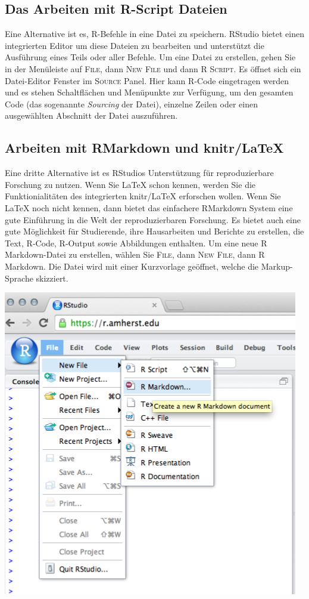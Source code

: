 \documentclass[
  ngerman,
]{scrbook}
\begin{document}
\hypertarget{das-arbeiten-mit-r-script-dateien}{%
\subsection{Das Arbeiten mit R-Script Dateien}\label{das-arbeiten-mit-r-script-dateien}}

Eine Alternative ist es, \textsf{R}-Befehle in eine Datei zu speichern. \textsf{RStudio} bietet einen integrierten Editor um diese Dateien zu bearbeiten und unterstützt die Ausführung eines Teils oder aller Befehle.
Um eine Datei zu erstellen, gehen Sie in der Menüleiste auf \textsc{File}, dann \textsc{New File} und dann \textsc{R Script}. Es öffnet sich ein Datei-Editor Fenster im \textsc{Source} Panel.
Hier kann \textsf{R}-Code eingetragen werden und es stehen Schaltflächen und Menüpunkte zur Verfügung, um den gesamten Code (das sogenannte \emph{Sourcing} der Datei), einzelne Zeilen oder einen ausgewählten Abschnitt der Datei auszuführen.

\hypertarget{arbeiten-mit-rmarkdown-und-knitrlatex}{%
\subsection{Arbeiten mit RMarkdown und knitr/LaTeX}\label{arbeiten-mit-rmarkdown-und-knitrlatex}}

Eine dritte Alternative ist es \textsf{RStudio}s Unterstützung für reproduzierbare Forschung zu nutzen. Wenn Sie \textsf{LaTeX} schon kennen, werden Sie die Funktionialitäten des integrierten \textsf{knitr/LaTeX} erforschen wollen. Wenn Sie \textsf{LaTeX} noch nicht kennen, dann bietet das einfachere RMarkdown System eine gute Einführung in die Welt der reproduzierbaren Forschung. Es bietet auch eine gute Möglichkeit für Studierende, ihre Hausarbeiten und Berichte zu erstellen, die Text, \textsf{R}-Code, \textsf{R}-Output sowie Abbildungen enthalten. Um eine neue \textsf{R Markdown}-Datei zu erstellen, wählen Sie \textsc{File}, dann \textsc{New File}, dann \textsf{R Markdown}. Die Datei wird mit einer Kurzvorlage geöffnet, welche die Markup-Sprache skizziert.

\begin{center}\includegraphics[width=0.4\linewidth]{images/rmarkdown1} \end{center}
\end{document}
